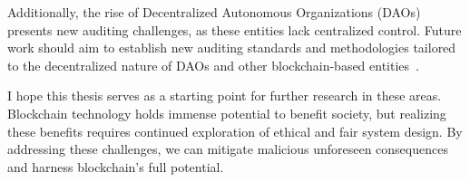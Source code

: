 Additionally, the rise of Decentralized Autonomous Organizations (DAOs) presents new auditing challenges, as these entities lack centralized control. Future work should aim to establish new auditing standards and methodologies tailored to the decentralized nature of DAOs and other blockchain-based entities~\cite{tan2023open}.


\vspace{10mm}

I hope this thesis serves as a starting point for further research in these areas. Blockchain technology holds immense potential to benefit society, but realizing these benefits requires continued exploration of ethical and fair system design. By addressing these challenges, we can mitigate malicious unforeseen consequences and harness blockchain's full potential.

